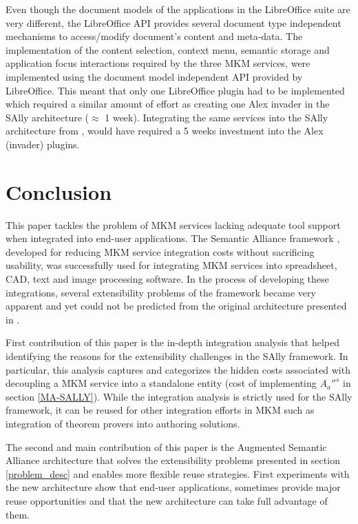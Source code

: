 \documentclass{llncs}
\begin{document}
Even though the document models of the applications in the LibreOffice suite are very different, the LibreOffice API provides several document type independent mechanisms to access/modify document's content and meta-data. The implementation of the content selection, context menu, semantic storage and application focus  interactions required by the three MKM services, were implemented using the document model independent API provided by LibreOffice. This meant that only one LibreOffice plugin had to be implemented which required a similar amount of effort as creating one Alex invader in the SAlly architecture ($\approx$ 1 week). Integrating the same services into the SAlly architecture from \cite{DavJucKoh:safusa12}, would have required a 5 weeks investment into the Alex (invader) plugins. 






\section{Conclusion}
This paper tackles the problem of MKM services lacking adequate tool support when integrated into end-user applications. The Semantic Alliance framework \cite{DavJucKoh:safusa12}, developed for reducing MKM service integration costs without sacrificing usability, was successfully used for integrating MKM services into spreadsheet\cite{DavJucKoh:safusa12}, CAD\cite{KohlhaseEtAl:FullSemanticTransparency:2013}, text and image \cite{design2014} processing software. In the process of developing these integrations, several extensibility problems of the framework became very apparent and yet could not be predicted from the original architecture presented in \cite{DavJucKoh:safusa12}.

First contribution of this paper is the in-depth integration analysis that helped identifying the reasons for the extensibility challenges in the SAlly framework. In particular, this analysis captures and categorizes the hidden costs associated with decoupling a MKM service into a standalone entity (cost of implementing $A_a''^s$ in section \ref{MA-SALLY}). While the integration analysis is strictly used for the SAlly framework, it can be reused for other integration efforts in MKM such as integration of theorem provers into authoring solutions. 

The second and main contribution of this paper is the Augmented Semantic Alliance architecture that solves the extensibility problems presented in section \ref{problem_desc} and enables more flexible reuse strategies. First experiments with the new architecture show that end-user applications, sometimes provide major reuse opportunities and that the new architecture can take full advantage of them.



\printbibliography
\end{document}
